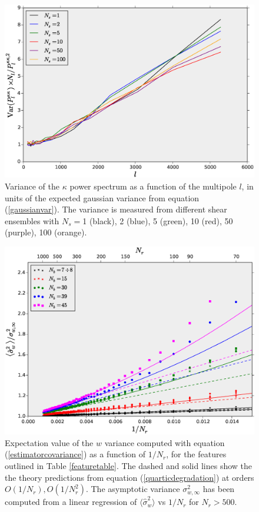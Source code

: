 \documentclass[reprint,aps,prd,superscriptaddress,showkeys,showpacs]{revtex4-1}
\newcommand{\h}[1]{\hat{#1}}
\begin{document}
\begin{figure}
\includegraphics[scale=0.3]{Figures/ps_variance.eps}
\caption{Variance of the $\kappa$ power spectrum as a function of the multipole $l$, in units of the expected gaussian variance from equation (\ref{gaussianvar}). The variance is measured from different shear ensembles with $N_s=$1 (black), 2 (blue), 5 (green), 10 (red), 50 (purple), 100 (orange). }
\label{ps_var}
\end{figure}

\begin{figure}
\includegraphics[scale=0.3]{Figures/curving_nb.eps}
\caption{Expectation value of the $w$ variance computed with equation (\ref{estimatorcovariance}) as a function of $1/N_r$, for the features outlined in Table \ref{featuretable}. The dashed and solid lines show the the theory predictions from equation (\ref{quarticdegradation}) at orders $O(1/N_r),O(1/N_r^2)$. The asymptotic variance $\sigma^2_{w,\infty}$ has been computed from a linear regression of $\langle\h{\sigma}^2_w\rangle$ vs $1/N_r$ for $N_r>500$.}
\label{curvingnb}
\end{figure}
\end{document}
